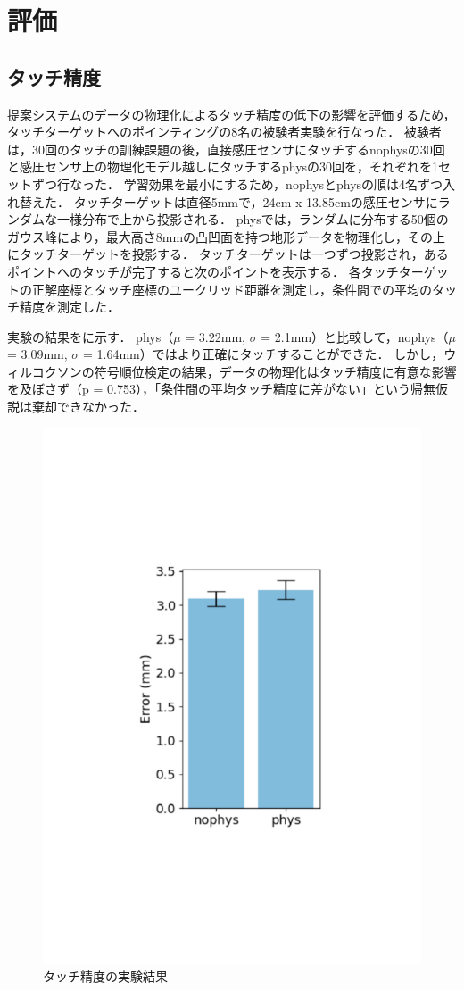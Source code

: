 \documentclass[a4paper,10pt,twocolumn,uplatex]{jsarticle}
\begin{document}

\section{評価}
\subsection{タッチ精度}
提案システムのデータの物理化によるタッチ精度の低下の影響を評価するため，タッチターゲットへのポインティングの8名の被験者実験を行なった．
被験者は，30回のタッチの訓練課題の後，直接感圧センサにタッチするnophysの30回と感圧センサ上の物理化モデル越しにタッチするphysの30回を，それぞれを1セットずつ行なった．
学習効果を最小にするため，nophysとphysの順は4名ずつ入れ替えた．
タッチターゲットは直径5mmで，24cm x 13.85cmの感圧センサにランダムな一様分布で上から投影される．
physでは，ランダムに分布する50個のガウス峰により，最大高さ8mmの凸凹面を持つ地形データを物理化し，その上にタッチターゲットを投影する．
タッチターゲットは一つずつ投影され，あるポイントへのタッチが完了すると次のポイントを表示する．
各タッチターゲットの正解座標とタッチ座標のユークリッド距離を測定し，条件間での平均のタッチ精度を測定した．\par
実験の結果をに示す．
phys（$\mu$ = 3.22mm, $\sigma$ = 2.1mm）と比較して，nophys（$\mu$ = 3.09mm, $\sigma$ = 1.64mm）ではより正確にタッチすることができた．
しかし，ウィルコクソンの符号順位検定の結果，データの物理化はタッチ精度に有意な影響を及ぼさず（p = 0.753），「条件間の平均タッチ精度に差がない」という帰無仮説は棄却できなかった．

\begin{figure}[t]
	\begin{centering}
    \includegraphics[width=0.35\linewidth]{img/touch.pdf}
    \caption{タッチ精度の実験結果}
    \label{fig:touch}
    \end{centering}
\end{figure}
\end{document}
